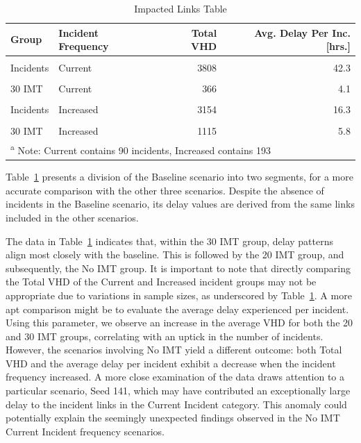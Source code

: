 \documentclass[fancy, oneside, mastersfancy, ms]{byuthesis}
\begin{document}
\hypertarget{tbl-impacted_links}{}
\begin{table}
\caption{\label{tbl-impacted_links}Impacted Links Table }\tabularnewline

\centering
\begin{tabular}[t]{llrr}
\toprule
\textbf{Group} & \textbf{Incident Frequency} & \textbf{Total VHD} & \textbf{Avg. Delay Per Inc. [hrs.]}\\
\midrule
\cellcolor{gray!6}{Baseline} & \cellcolor{gray!6}{Current} & \cellcolor{gray!6}{326} & \cellcolor{gray!6}{3.6}\\
Incidents & Current & 3808 & 42.3\\
\cellcolor{gray!6}{20 IMT} & \cellcolor{gray!6}{Current} & \cellcolor{gray!6}{723} & \cellcolor{gray!6}{8.0}\\
30 IMT & Current & 366 & 4.1\\
\cellcolor{gray!6}{Baseline} & \cellcolor{gray!6}{Increased} & \cellcolor{gray!6}{540} & \cellcolor{gray!6}{2.8}\\
\addlinespace
Incidents & Increased & 3154 & 16.3\\
\cellcolor{gray!6}{20 IMT} & \cellcolor{gray!6}{Increased} & \cellcolor{gray!6}{1645} & \cellcolor{gray!6}{8.5}\\
30 IMT & Increased & 1115 & 5.8\\
\bottomrule
\multicolumn{4}{l}{\textsuperscript{a} Note: Current contains 90 incidents, Increased contains 193}\\
\end{tabular}
\end{table}

Table~\ref{tbl-impacted_links} presents a division of the Baseline
scenario into two segments, for a more accurate comparison with the
other three scenarios. Despite the absence of incidents in the Baseline
scenario, its delay values are derived from the same links included in
the other scenarios.

The data in Table~\ref{tbl-impacted_links} indicates that, within the 30
IMT group, delay patterns align most closely with the baseline. This is
followed by the 20 IMT group, and subsequently, the No IMT group. It is
important to note that directly comparing the Total VHD of the Current
and Increased incident groups may not be appropriate due to variations
in sample sizes, as underscored by Table~\ref{tbl-impacted_links}. A
more apt comparison might be to evaluate the average delay experienced
per incident. Using this parameter, we observe an increase in the
average VHD for both the 20 and 30 IMT groups, correlating with an
uptick in the number of incidents. However, the scenarios involving No
IMT yield a different outcome: both Total VHD and the average delay per
incident exhibit a decrease when the incident frequency increased. A
more close examination of the data draws attention to a particular
scenario, Seed 141, which may have contributed an exceptionally large
delay to the incident links in the Current Incident category. This
anomaly could potentially explain the seemingly unexpected findings
observed in the No IMT Current Incident frequency scenarios.
\end{document}

